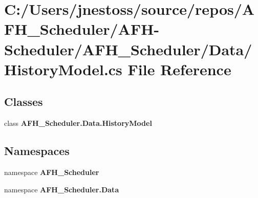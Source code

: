 \section{C\+:/\+Users/jnestoss/source/repos/\+A\+F\+H\+\_\+\+Scheduler/\+A\+F\+H-\/\+Scheduler/\+A\+F\+H\+\_\+\+Scheduler/\+Data/\+History\+Model.cs File Reference}
\label{_history_model_8cs}
\subsection*{Classes}
\begin{DoxyCompactItemize}
\item 
class \textbf{ A\+F\+H\+\_\+\+Scheduler.\+Data.\+History\+Model}
\end{DoxyCompactItemize}
\subsection*{Namespaces}
\begin{DoxyCompactItemize}
\item 
namespace \textbf{ A\+F\+H\+\_\+\+Scheduler}
\item 
namespace \textbf{ A\+F\+H\+\_\+\+Scheduler.\+Data}
\end{DoxyCompactItemize}
